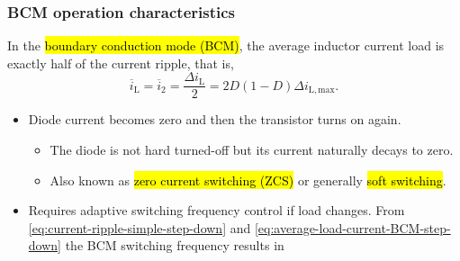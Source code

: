 \begin{frame}
    \frametitle{BCM operation characteristics}
    In the \hl{boundary conduction mode (BCM)}, the average inductor current load is exactly half of the current ripple, that is, 
    \begin{equation}
        \overline{i}_\mathrm{L}=\overline{i}_2=\frac{\Delta i_\mathrm{L}}{2}= 2D(1-D)\Delta i_\mathrm{L,max}.
        \label{eq:average-load-current-BCM-step-down}
    \end{equation}
    \pause
    \vspace{-0.5cm}
    \begin{itemize}
        \item<2-> Diode current becomes zero and then the transistor turns on again.
        \begin{itemize}
            \item The diode is not hard turned-off but its current naturally decays to zero.
            \item Also known as \hl{zero current switching (ZCS)} or generally \hl{soft switching}.
        \end{itemize}
        \item<3-> Requires adaptive switching frequency control if load changes. From \eqref{eq:current-ripple-simple-step-down} and \eqref{eq:average-load-current-BCM-step-down} the BCM switching frequency results in 
    \end{itemize}
\end{frame}

